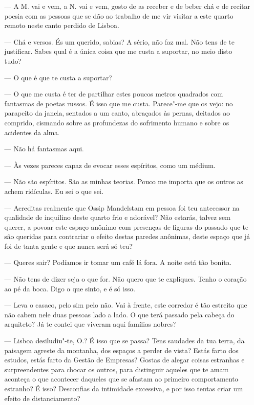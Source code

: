 --- A M. vai e vem, a N. vai e vem, gosto de as receber e de beber chá e
  de recitar poesia com as pessoas que se dão ao trabalho de me vir
  visitar a este quarto remoto neste canto perdido de Lisboa.

--- Chá e versos. És um querido, sabias? A sério, não faz mal. Não tens de
  te justificar. Sabes qual é a única coisa que me custa a suportar, no
  meio disto tudo?

--- O que é que te custa a suportar?

--- O que me custa é ter de partilhar estes poucos metros quadrados com
  fantasmas de poetas russos. É isso que me custa. Parece"-me que os
  vejo: no parapeito da janela, sentados a um canto, abraçados às
  pernas, deitados ao comprido, cismando sobre as profundezas do
  sofrimento humano e sobre os acidentes da alma.

--- Não há fantasmas aqui.

--- Às vezes pareces capaz de evocar esses espíritos, como um médium.

--- Não são espíritos. São as minhas teorias. Pouco me importa que os
  outros as achem ridículas. Eu sei o que sei.

--- Acreditas realmente que Ossip Mandelstam em pessoa
foi teu antecessor na qualidade de inquilino deste quarto frio e
adorável? Não estarás, talvez sem querer, a povoar este espaço anônimo
com presenças de figuras do passado que te são queridas para
contrariar o efeito destas paredes anônimas, deste espaço que já foi de
tanta gente e que nunca será só teu?

--- Queres sair? Podíamos ir tomar um café lá fora. A noite está tão
  bonita.

--- Não tens de dizer seja o que for. Não quero que te expliques. Tenho o
  coração ao pé da boca. Digo o que sinto, e é só isso.

--- Leva o casaco, pelo sim pelo não. Vai à frente, este corredor é tão
  estreito que não cabem nele duas pessoas lado a lado. O que terá
  passado pela cabeça do arquiteto? Já te contei que viveram aqui
  famílias nobres?

--- Lisboa desiludiu"-te, O.? É isso que se passa? Tens saudades da tua
  terra, da paisagem agreste da montanha, dos espaços a perder de
  vista? Estás farto dos estudos, estás farto da Gestão de Empresas?
  Gostas de alegar coisas estranhas e surpreendentes para chocar os
  outros, para distinguir aqueles que te amam aconteça o que acontecer
  daqueles que se afastam ao primeiro comportamento estranho? É isso?
  Desconfias da intimidade excessiva, e por isso tentas criar um efeito
  de distanciamento?

